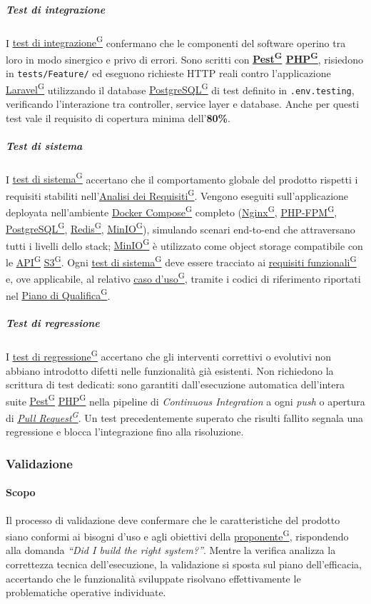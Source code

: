 \documentclass[a4paper,12pt]{article}
\providecommand{\glslink}[2]{\href{https://alittlebyte-19.github.io/Documentazione/glossario.html\#gls-#1}{\underline{#2}\textsuperscript{\scriptsize G}}}
\begin{document}
\subparagraph{Test di integrazione}
I \glslink{test-di-integrazione}{test di integrazione} confermano che le componenti del software operino tra loro in modo sinergico e privo di errori. Sono scritti con \textbf{\glslink{pest}{Pest} \glslink{php}{PHP}}, risiedono in \texttt{tests/Feature/} ed eseguono richieste HTTP reali contro l'applicazione \glslink{laravel}{Laravel} utilizzando il database \glslink{postgresql}{PostgreSQL} di test definito in \texttt{.env.testing}, verificando l'interazione tra controller, service layer e database. Anche per questi test vale il requisito di copertura minima dell'\textbf{80\%}.

\subparagraph{Test di sistema}
I \glslink{test-di-sistema}{test di sistema} accertano che il comportamento globale del prodotto rispetti i requisiti stabiliti nell'\glslink{analisi-dei-requisiti-adr}{Analisi dei Requisiti}. Vengono eseguiti sull'applicazione deployata nell'ambiente \glslink{docker-compose}{Docker Compose} completo (\glslink{nginx}{Nginx}, \glslink{php-fpm}{PHP-FPM}, \glslink{postgresql}{PostgreSQL}, \glslink{redis}{Redis}, \glslink{minio}{MinIO}), simulando scenari end-to-end che attraversano tutti i livelli dello stack; \glslink{minio}{MinIO} è utilizzato come object storage compatibile con le \glslink{api-application-programming-interface}{API} \glslink{s3-simple-storage-service}{S3}. Ogni \glslink{test-di-sistema}{test di sistema} deve essere tracciato ai \glslink{requisito-funzionale}{requisiti funzionali} e, ove applicabile, al relativo \glslink{caso-d-uso-uc}{caso d'uso}, tramite i codici di riferimento riportati nel \glslink{piano-di-qualifica}{Piano di Qualifica}.

\subparagraph{Test di regressione}
I \glslink{test-di-regressione}{test di regressione} accertano che gli interventi correttivi o evolutivi non abbiano introdotto difetti nelle funzionalità già esistenti. Non richiedono la scrittura di test dedicati: sono garantiti dall'esecuzione automatica dell'intera suite \glslink{pest}{Pest} \glslink{php}{PHP} nella pipeline di \textit{Continuous Integration} a ogni \textit{push} o apertura di \textit{\glslink{pull-request}{Pull Request}}. Un test precedentemente superato che risulti fallito segnala una regressione e blocca l'integrazione fino alla risoluzione.

\subsubsection{Validazione}

\paragraph{Scopo}
Il processo di validazione deve confermare che le caratteristiche del prodotto siano conformi ai bisogni d'uso e agli obiettivi della \glslink{committente-proponente}{proponente}, rispondendo alla domanda \textit{``Did I build the right system?''}. Mentre la verifica analizza la correttezza tecnica dell'esecuzione, la validazione si sposta sul piano dell'efficacia, accertando che le funzionalità sviluppate risolvano effettivamente le problematiche operative individuate.
\end{document}
